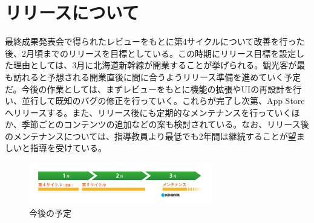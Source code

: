 \section{リリースについて}
最終成果発表会で得られたレビューをもとに第4サイクルについて改善を行った後、2月頃までのリリースを目標としている。この時期にリリース目標を設定した理由としては、3月に北海道新幹線が開業することが挙げられる。観光客が最も訪れると予想される開業直後に間に合うようリリース準備を進めていく予定だ。今後の作業としては、まずレビューをもとに機能の拡張やUIの再設計を行い、並行して既知のバグの修正を行っていく。これらが完了し次第、App Storeへリリースする。また、リリース後にも定期的なメンテナンスを行っていくほか、季節ごとのコンテンツの追加などの案も検討されている。なお、リリース後のメンテナンスについては、指導教員より最低でも2年間は継続することが望ましいと指導を受けている。
\begin{figure}
	\centering
	\includegraphics[width=8cm]{release-1.png}
	\caption{今後の予定}
\end{figure}
